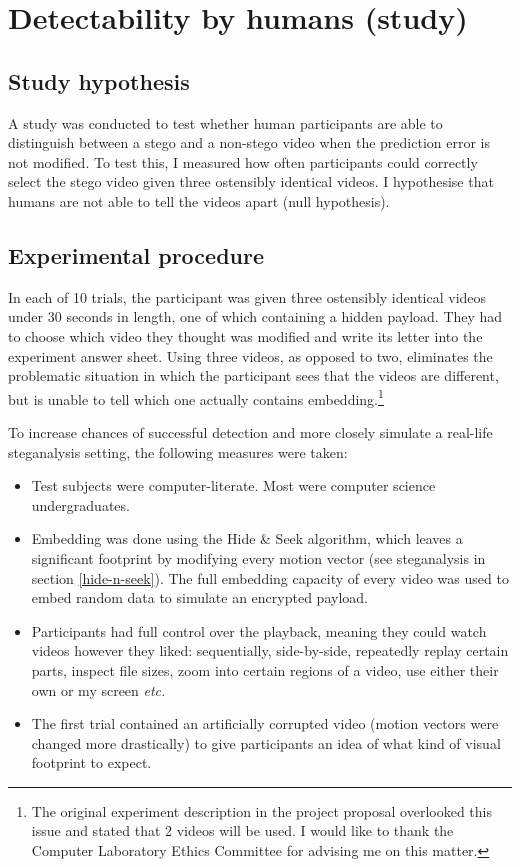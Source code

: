 \documentclass[12pt,british,twoside,notitlepage,usenames,dvipsnames,hypens,final]{report}
\numberwithin{equation}{section}
\numberwithin{figure}{section}
\begin{document}
\section{Detectability by humans (study)}
\label{exp-human-subj}

\subsection{Study hypothesis}

A study was conducted to test whether human participants are able to distinguish between a stego and a non-stego video when the prediction error is not modified. To test this, I measured how often participants could correctly select the stego video given three ostensibly identical videos. I hypothesise that humans are not able to tell the videos apart (null hypothesis).

\subsection{Experimental procedure}

In each of 10 trials, the participant was given three ostensibly identical videos under 30 seconds in length, one of which containing a hidden payload. They had to choose which video they thought was modified and write its letter into the experiment answer sheet. Using three videos, as opposed to two, eliminates the problematic situation in which the participant sees that the videos are different, but is unable to tell which one actually contains embedding.\footnote{The original experiment description in the project proposal overlooked this issue and stated that 2 videos will be used. I would like to thank the Computer Laboratory Ethics Committee for advising me on this matter.}

To increase chances of successful detection and more closely simulate a real-life steganalysis setting, the following measures were taken:
\begin{itemize}
\item Test subjects were computer-literate. Most were computer science undergraduates.
\item Embedding was done using the Hide \& Seek algorithm, which leaves a significant footprint by modifying every motion vector (see steganalysis in section \ref{hide-n-seek}). The full embedding capacity of every video was used to embed random data to simulate an encrypted payload. 
\item Participants had full control over the playback, meaning they could watch videos however they liked: sequentially, side-by-side, repeatedly replay certain parts, inspect file sizes, zoom into certain regions of a video, use either their own or my screen \emph{etc.}
\item The first trial contained an artificially corrupted video (motion vectors were changed more drastically) to give participants an idea of what kind of visual footprint to expect. 
\end{itemize}
\end{document}
